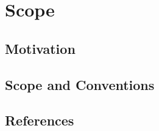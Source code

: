 



\section{Scope}

\subsection{Motivation}



\subsection{Scope and Conventions}
\label{sec:scope}



\subsection{References}





